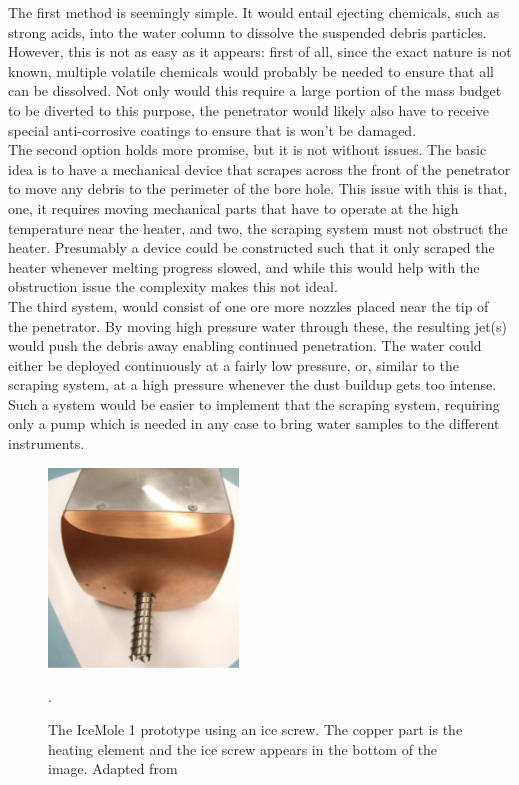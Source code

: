 \noindent
The first method is seemingly simple. It would entail ejecting chemicals, such as strong acids, into the water column to dissolve the suspended debris particles. However, this is not as easy as it appears: first of all, since the exact nature is not known, multiple volatile chemicals would probably be needed to ensure that all can be dissolved. Not only would this require a large portion of the mass budget to be diverted to this purpose, the penetrator would likely also have to receive special anti-corrosive coatings to ensure that is won't be damaged.\\

\noindent
The second option holds more promise, but it is not without issues. The basic idea is to have a mechanical device that scrapes across the front of the penetrator to move any debris to the perimeter of the bore hole. This issue with this is that, one, it requires moving mechanical parts that have to operate at the high temperature near the heater, and two, the scraping system must not obstruct the heater. Presumably a device could be constructed such that it only scraped the heater whenever melting progress slowed, and while this would help with the obstruction issue the complexity makes this not ideal.\\

\noindent
The third system, would consist of one ore more nozzles placed near the tip of the penetrator. By moving high pressure water through these, the resulting jet(s) would push the debris away enabling continued penetration. The water could either be deployed continuously at a fairly low pressure, or, similar to the scraping system, at a high pressure whenever the dust buildup gets too intense. Such a system would be easier to implement that the scraping system, requiring only a pump which is needed in any case to bring water samples to the different instruments.\\

 \begin{figure}[ht]
 	\centering
 	\includegraphics[width=0.45\textwidth]{figures/LAMC/iceScrew}
 	\caption{The IceMole 1 prototype using an ice screw. The copper part is the heating element and the ice screw appears in the bottom of the image. Adapted from \cite{article:dachwald2014a}}.
 	\label{fig:iceScrew}
 \end{figure}   
 
